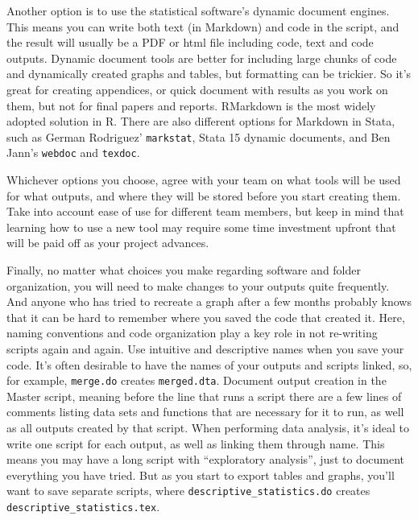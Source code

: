 Another option is to use the statistical software's dynamic document engines.
This means you can write both text (in Markdown) and code in the script,
and the result will usually be a PDF or html file including code,
text and code outputs.
Dynamic document tools are better for including large chunks of code and dynamically created graphs and tables,
but formatting can be trickier.
So it's great for creating appendices,
or quick document with results as you work on them,
but not for final papers and reports.
RMarkdown is the most widely adopted solution in R.
There are also different options for Markdown in Stata,
such as German Rodriguez' \texttt{markstat},
Stata 15 dynamic documents,
and Ben Jann's \texttt{webdoc} and
\texttt{texdoc}.

Whichever options you choose,
agree with your team on what tools will be used for what outputs, and
where they will be stored before you start creating them.
Take into account ease of use for different team members, but
keep in mind that learning how to use a new tool may require some
time investment upfront that will be paid off as your project advances.

Finally, no matter what choices you make regarding software and folder organization,
you will need to make changes to your outputs quite frequently.
And anyone who has tried to recreate a graph after a few months probably knows
that it can be hard to remember where you saved the code that created it.
Here, naming conventions and code organization play a key role in not re-writing scripts again and again.
Use intuitive and descriptive names when you save your code.
It's often desirable to have the names of your outputs and scripts linked,
so, for example, \texttt{merge.do} creates \texttt{merged.dta}.
Document output creation in the Master script,
meaning before the line that runs a script there are a few lines of comments listing
data sets and functions that are necessary for it to run,
as well as all outputs created by that script.
When performing data analysis,
it's ideal to write one script for each output,
as well as linking them through name.
This means you may have a long script with ``exploratory analysis'',
just to document everything you have tried.
But as you start to export tables and graphs,
you'll want to save separate scripts, where
\texttt{descriptive\_statistics.do} creates \texttt{descriptive\_statistics.tex}.
